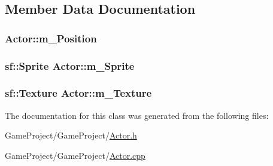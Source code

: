 \subsection{Member Data Documentation}
\hypertarget{class_actor_a7c6e321fb5b42e47c98ad548f2ef4122}{
\subsubsection[{m\-\_\-\-Position}]{ Actor\-::m\-\_\-\-Position\hspace{0.3cm}{\ttfamily [private]}}}\label{class_actor_a7c6e321fb5b42e47c98ad548f2ef4122}
\hypertarget{class_actor_a043c786e0933f1cfdaded0d5e1d504e6}{
\subsubsection[{m\-\_\-\-Sprite}]{\setlength{\rightskip}{0pt plus 5cm}sf\-::\-Sprite Actor\-::m\-\_\-\-Sprite\hspace{0.3cm}{\ttfamily [private]}}}\label{class_actor_a043c786e0933f1cfdaded0d5e1d504e6}
\hypertarget{class_actor_a6cb7c1cd422797dc023776229b69eb6f}{
\subsubsection[{m\-\_\-\-Texture}]{\setlength{\rightskip}{0pt plus 5cm}sf\-::\-Texture Actor\-::m\-\_\-\-Texture\hspace{0.3cm}{\ttfamily [private]}}}\label{class_actor_a6cb7c1cd422797dc023776229b69eb6f}


The documentation for this class was generated from the following files\-:\begin{DoxyCompactItemize}
\item 
Game\-Project/\-Game\-Project/\hyperlink{_actor_8h}{Actor.\-h}\item 
Game\-Project/\-Game\-Project/\hyperlink{_actor_8cpp}{Actor.\-cpp}\end{DoxyCompactItemize}
